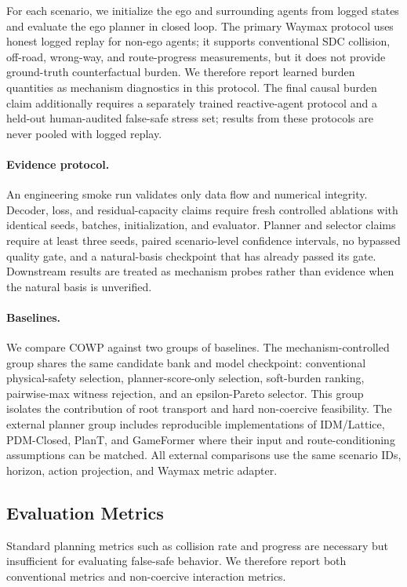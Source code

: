 \documentclass[10pt]{article}
\begin{document}
For each scenario, we initialize the ego and surrounding agents from logged states and evaluate the ego planner in closed loop. The primary Waymax protocol uses honest logged replay for non-ego agents; it supports conventional SDC collision, off-road, wrong-way, and route-progress measurements, but it does not provide ground-truth counterfactual burden. We therefore report learned burden quantities as mechanism diagnostics in this protocol. The final causal burden claim additionally requires a separately trained reactive-agent protocol and a held-out human-audited false-safe stress set; results from these protocols are never pooled with logged replay.

\paragraph{Evidence protocol.}
An engineering smoke run validates only data flow and numerical integrity. Decoder, loss, and residual-capacity claims require fresh controlled ablations with identical seeds, batches, initialization, and evaluator. Planner and selector claims require at least three seeds, paired scenario-level confidence intervals, no bypassed quality gate, and a natural-basis checkpoint that has already passed its gate. Downstream results are treated as mechanism probes rather than evidence when the natural basis is unverified.

\paragraph{Baselines.}
We compare COWP against two groups of baselines. The mechanism-controlled group shares the same candidate bank and model checkpoint: conventional physical-safety selection, planner-score-only selection, soft-burden ranking, pairwise-max witness rejection, and an epsilon-Pareto selector. This group isolates the contribution of root transport and hard non-coercive feasibility. The external planner group includes reproducible implementations of IDM/Lattice, PDM-Closed, PlanT, and GameFormer where their input and route-conditioning assumptions can be matched. All external comparisons use the same scenario IDs, horizon, action projection, and Waymax metric adapter.

\subsection{Evaluation Metrics}
\label{sec:metrics}

Standard planning metrics such as collision rate and progress are necessary but insufficient for evaluating false-safe behavior. We therefore report both conventional metrics and non-coercive interaction metrics.
\end{document}
